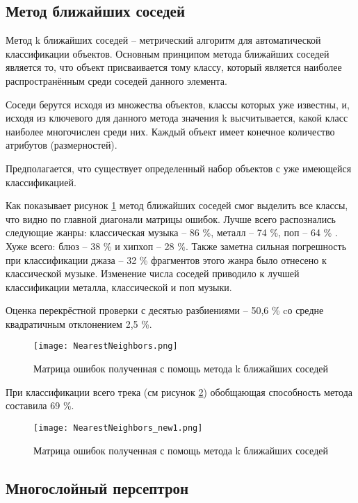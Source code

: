 \subsection{Метод ближайших соседей}

Метод k ближайших соседей -- метрический алгоритм для автоматической классификации объектов. Основным принципом метода ближайших соседей является то, что объект присваивается тому классу, который является наиболее распространённым среди соседей данного элемента.

Соседи берутся исходя из множества объектов, классы которых уже известны, и, исходя из ключевого для данного метода значения k высчитывается, какой класс наиболее многочислен среди них. Каждый объект имеет конечное количество атрибутов (размерностей).

Предполагается, что существует определенный набор объектов с уже имеющейся классификацией.

Как показывает рисунок \ref{fig:results:NearestNeighbors} метод ближайших соседей смог выделить все классы, что видно по главной диагонали матрицы ошибок. Лучше всего распознались следующие жанры: классическая музыка -- 86 \%, металл -- 74 \%, поп -- 64 \% . Хуже всего: блюз -- 38 \% и хипхоп -- 28 \%. Также заметна сильная погрешность при классификации  джаза -- 32 \% фрагментов этого жанра было отнесено к классической музыке. Изменение числа соседей приводило к лучшей классификации металла, классической и поп музыки. 

Оценка перекрёстной проверки с десятью разбиениями -- 50,6 \% cо средне квадратичным отклонением 2,5 \%.  

\begin{figure}[h]
\centering
  \texttt{[image: NearestNeighbors.png]}
  \caption{Матрица ошибок полученная с помощь метода k ближайших соседей}
  \label{fig:results:NearestNeighbors}
\end{figure}

При классификации всего трека (см рисунок \ref{fig:results:NearestNeighbors_new}) обобщающая способность метода составила 69 \%. 

\begin{figure}[h]
\centering
  \texttt{[image: NearestNeighbors\_new1.png]}
  \caption{Матрица ошибок полученная с помощь метода k ближайших соседей}
  \label{fig:results:NearestNeighbors_new}
\end{figure}



\subsection{Многослойный персептрон}


